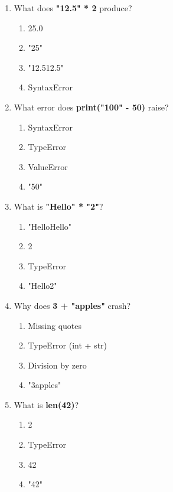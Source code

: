 \documentclass{article}
\begin{document}
\begin{multicols*}{4}
\begin{enumerate}
        \item What does \textbf{"12.5" * 2} produce?
        \begin{enumerate}[label=(\Alph*)]
            \item 25.0
            \item "25"
            \item "12.512.5"
            \item SyntaxError
        \end{enumerate}

        \item What error does \textbf{print("100" - 50)} raise?
        \begin{enumerate}[label=(\Alph*)]
            \item SyntaxError
            \item TypeError
            \item ValueError
            \item "50"
        \end{enumerate}

        \item What is \textbf{"Hello" * "2"}?
        \begin{enumerate}[label=(\Alph*)]
            \item "HelloHello"
            \item 2
            \item TypeError
            \item "Hello2"
        \end{enumerate}

        \item Why does \textbf{3 + "apples"} crash?
        \begin{enumerate}[label=(\Alph*)]
            \item Missing quotes
            \item TypeError (int + str)
            \item Division by zero
            \item "3apples"
        \end{enumerate}

        \item What is \textbf{len(42)}?
        \begin{enumerate}[label=(\Alph*)]
            \item 2
            \item TypeError
            \item 42
            \item "42"
        \end{enumerate}


\end{enumerate}
\end{multicols*}
\end{document}
